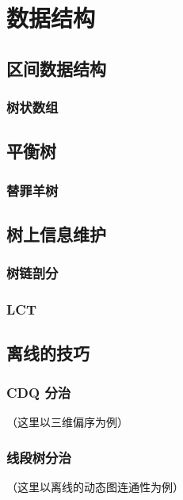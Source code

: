 \chapter{数据结构}

\section{区间数据结构}
\subsection{树状数组}


\section{平衡树}
\subsection{替罪羊树}


\section{树上信息维护}
\subsection{树链剖分}

\subsection{LCT}


\section{离线的技巧}
\subsection{CDQ 分治}
（这里以三维偏序为例）

\subsection{线段树分治}
（这里以离线的动态图连通性为例）

